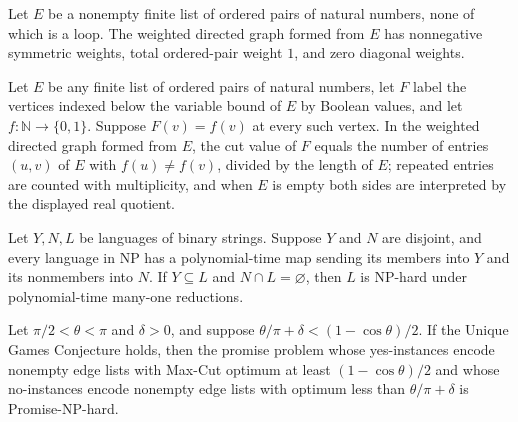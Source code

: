 \begin{theorem}
\label{BooleanAnalysis.GaussianSpace.UniqueGames.maxCutGraph_valid}
\leanok
{}
Let $E$ be a nonempty finite list of ordered pairs of natural numbers, none of which is
a loop. The weighted directed graph formed from $E$ has nonnegative symmetric weights,
total ordered-pair weight $1$, and zero diagonal weights.
\end{theorem}

\begin{theorem}
\label{BooleanAnalysis.GaussianSpace.UniqueGames.maxCutGraph_cutValue}
\leanok
{}
Let $E$ be any finite list of ordered pairs of natural numbers, let $F$ label the
vertices indexed below the variable bound of $E$ by Boolean values, and let $f:\mathbb
N\to\{0,1\}$. Suppose $F(v)=f(v)$ at every such vertex. In the weighted directed graph
formed from $E$, the cut value of $F$ equals the number of entries $(u,v)$ of $E$ with
$f(u)\ne f(v)$, divided by the length of $E$; repeated entries are counted with
multiplicity, and when $E$ is empty both sides are interpreted by the displayed real
quotient.
\end{theorem}

\begin{theorem}
\label{BooleanAnalysis.GaussianSpace.UniqueGames.PromiseNPHard.separating_language}
\leanok
{}
Let $Y,N,L$ be languages of binary strings. Suppose $Y$ and $N$ are disjoint, and every
language in NP has a polynomial-time map sending its members into $Y$ and its nonmembers
into $N$. If $Y\subseteq L$ and $N\cap L=\varnothing$, then $L$ is NP-hard under
polynomial-time many-one reductions.
\end{theorem}

\begin{theorem}
\label{BooleanAnalysis.GaussianSpace.UniqueGames.maxCut_ug_hard}
\leanok
{}
Let $\pi/2<\theta<\pi$ and $\delta>0$, and suppose $\theta/\pi+\delta<(1-\cos\theta)/2$.
If the Unique Games Conjecture holds, then the promise problem whose yes-instances
encode nonempty edge lists with Max-Cut optimum at least $(1-\cos\theta)/2$ and whose
no-instances encode nonempty edge lists with optimum less than $\theta/\pi+\delta$ is
Promise-NP-hard.
\end{theorem}

